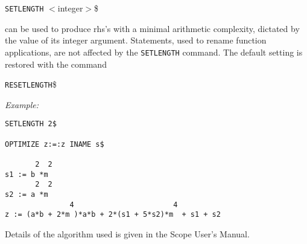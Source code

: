 \hspace*{1cm} {\tt SETLENGTH} $<$integer$>$\$

can be used to produce rhs's with a minimal arithmetic complexity,
dictated by the value of
its integer argument. Statements, used to rename function applications, are
not affected by the {\tt SETLENGTH} command. The default setting is restored
with the command

\hspace*{1cm} {\tt RESETLENGTH}\$

{\em Example:}
\begin{verbatim}
SETLENGTH 2$

OPTIMIZE z:=:z INAME s$

       2  2
s1 := b *m
       2  2
s2 := a *m
               4                       4
z := (a*b + 2*m )*a*b + 2*(s1 + 5*s2)*m  + s1 + s2

\end{verbatim}

Details of the algorithm used is given in the Scope User's Manual.


